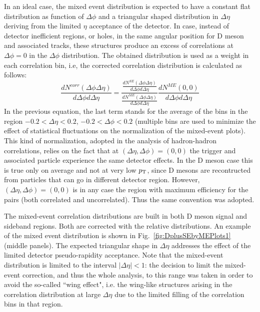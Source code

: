 In an ideal case, the mixed event distribution is expected to have a constant flat distribution as function of $\Delta\phi$ and a triangular shaped distribution in $\Delta\eta$
deriving from the limited $\eta$ acceptance of the detector. In case, instead of detector inefficient regions, or holes, in the same angular position for D meson and associated tracks, these structures produce an excess of correlations at $\Delta\phi=0$ in the $\Delta\phi$ distribution. The obtained distribution is used as a weight in each correlation bin, i.e, the corrected correlation distribution is calculated as follows:
\begin{equation}
\label{eq:mixing}
\frac{dN^{corr}\left(\Delta\phi \Delta\eta\right)}{d\Delta\phi d\Delta\eta} = \frac{\frac{dN^{SE}\left(\Delta\phi \Delta\eta\right)}{d\Delta\phi d\Delta\eta} }{\frac{dN^{ME}\left(\Delta\phi \Delta\eta\right)}{d\Delta\phi d\Delta\eta} }\frac{dN^{ME}\left(0,  0\right)}{d\Delta\phi d\Delta\eta}
\end{equation}
In the previous equation, the last term stands for the average of the bins in the region $-0.2 < \Delta\eta < 0.2$, $-0.2 < \Delta\phi < 0.2$ (multiple bins are used to minimize the effect of statistical fluctuations on the normalization of the mixed-event plots).
This kind of normalization, adopted in the analysis of hadron-hadron correlations, relies on the fact that at $(\Delta\eta,\Delta\phi)=(0,0)$ the trigger and associated particle experience the same detector effects. In the D meson case this is true only on average and not at very low $p_{\rm T}$, since D mesons are recontructed from particles that can go
in different detector region. However, $(\Delta\eta,\Delta\phi)=(0,0)$ is in any case
the region with maximum efficiency for the pairs (both correlated and uncorrelated). Thus the same convention was adopted.

The mixed-event correlation distributions are built in both D meson signal and sideband regions. Both are
corrected with the relative distributions. An example of the mixed event distribution is shown in Fig.~\ref{fig:DplusSEbyMEPlots1} (middle panels). The expected triangular
shape in $\Delta\eta$ addresses the effect of the limited detector pseudo-rapidity acceptance. Note that the mixed-event distribution is limited to
the interval $\left|\Delta\eta\right|<1$: the decision to limit the mixed-event correction, and thus the whole analysis, to this range was taken in
order to avoid the so-called ``wing effect", i.e. the wing-like structures arising in the correlation distribution at large $\Delta\eta$ due to the
limited filling of the correlation bins in that region.
